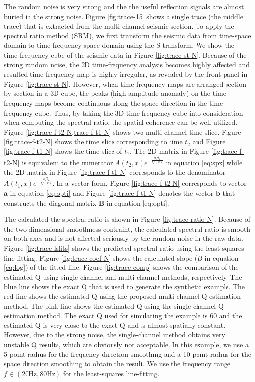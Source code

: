 The random noise is very strong and the the useful reflection signals are almost buried in the strong noise. Figure \ref{fig:trace-15} shows a single trace (the middle trace) that is extracted from the multi-channel seismic section.  To apply the spectral ratio method (SRM), we first transform the seismic data from time-space domain to time-frequency-space domain using the S transform. We show the time-frequency cube of the seismic data in Figure \ref{fig:trace-st-N}. Because of the strong random noise, the 2D time-frequency analysis becomes highly affected and resulted time-frequency map is highly irregular, as revealed by the front panel in Figure \ref{fig:trace-st-N}. However, when time-frequency maps are arranged section by section in a 3D cube, the peaks (high amplitude anomaly) on the time-frequency maps become continuous along the space direction in the time-frequency cube. Thus, by taking the 3D time-frequency cube into consideration when computing the spectral ratio, the spatial coherence can be well utilized. Figure \ref{fig:trace-f-t2-N,trace-f-t1-N} shows two multi-channel time slice. Figure \ref{fig:trace-f-t2-N} shows the time slice corresponding to time $t_2$ and Figure \ref{fig:trace-f-t1-N} shows the time slice of $t_1$. The 2D matrix in Figure \ref{fig:trace-f-t2-N} is equivalent to the numerator $A(t_2,x)e^{-\frac{\pi ft_2}{Q(x)}}$ in equation \ref{eq:spx} while the 2D matrix in Figure \ref{fig:trace-f-t1-N} corresponds to the denominator $A(t_1,x)e^{-\frac{\pi ft_2}{Q(x)}}$. In a vector form, Figure \ref{fig:trace-f-t2-N} corresponds to vector $\mathbf{a}$ in equation \ref{eq:opti} and Figure \ref{fig:trace-f-t1-N} denotes the vector $\mathbf{b}$ that constructs the diagonal matrix $\mathbf{B}$ in equation \ref{eq:opti}.

The calculated the spectral ratio is shown in Figure \ref{fig:trace-ratio-N}. Because of the two-dimensional smoothness contraint, the calculated spectral ratio is smooth on both axes and is not affected seriously by the random noise in the raw data. Figure \ref{fig:trace-lsfits} shows the predicted spectral ratio using the least-squares line-fitting. Figure \ref{fig:trace-coef-N} shows  the calculated slope ($B$ in equation \ref{eq:log}) of the fitted line.  Figure \ref{fig:trace-comp} shows the comparison of the estimated Q using single-channel and multi-channel methods, respectively. The blue line shows the exact Q that is used to generate the synthetic example. The red line shows the estimated Q using the proposed multi-channel Q estimation method. The pink line shows the estimated Q using the single-channel Q estimation method. The exact Q used for simulating the example is 60 and the estimated Q is very close to the exact Q and is almost spatially constant. However, due to the strong noise, the single-channel method obtains very unstable Q results, which are obviously not acceptable. In this example, we use a 5-point radius for the frequency direction smoothing and a 10-point radius for the space direction smoothing to obtain the result. We use the frequency range $f\in(20 \text{Hz},80 \text{Hz})$ for the least-squares line-fitting. 

